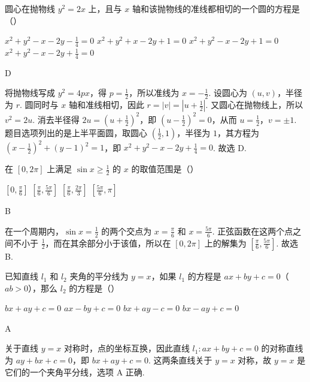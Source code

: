 \begin{problem}
圆心在抛物线 \(y^{2} = 2x \) 上，且与 \(x \) 轴和该抛物线的准线都相切的一个圆的方程是（\quad）

\choices
    {\(x^{2} + y^{2} - x - 2y - \frac{1}{4} = 0\)}
    {\(x^{2} + y^{2} + x - 2y + 1 = 0\)}
    {\(x^{2} + y^{2} - x - 2y + 1 = 0\)}
    {\(x^{2} + y^{2} - x - 2y + \frac{1}{4} = 0\)}

\begin{answer}
D
\end{answer}

\begin{solution}
将抛物线写成 \(y^2=4px\)，得 \(p=\frac{1}{2}\)，所以准线为 \(x=-\frac{1}{2}\). 设圆心为 \((u,v)\)，半径为 \(r\). 圆同时与 \(x\) 轴和准线相切，因此 \(r=|v|=\left|u+\frac{1}{2}\right|\). 又圆心在抛物线上，所以 \(v^2=2u\). 消去半径得
\(2u=\left(u+\frac{1}{2}\right)^2\)，即 \(\left(u-\frac{1}{2}\right)^2=0\)，从而 \(u=\frac{1}{2}\)，\(v=\pm1\). 题目选项列出的是上半平面圆，取圆心 \(\left(\frac{1}{2},1\right)\)，半径为 \(1\)，其方程为 \(\left(x-\frac{1}{2}\right)^2+(y-1)^2=1\)，即 \(x^2+y^2-x-2y+\frac{1}{4}=0\). 故选 D.
\end{solution}
\end{problem}

\begin{problem}
在 \([0,2\pi]\) 上满足 \(\sin x \geqslant \frac{1}{2}\) 的 \(x\) 的取值范围是（\quad）

\choices
    {\(\left[0, \frac{\pi}{6}\right]\)}
    {\(\left[\frac{\pi}{6}, \frac{5\pi}{6}\right]\)}
    {\(\left[\frac{\pi}{6}, \frac{2\pi}{3}\right]\)}
    {\(\left[\frac{5\pi}{6}, \pi\right]\)}

\begin{answer}
B
\end{answer}

\begin{solution}
在一个周期内，\(\sin x=\frac{1}{2}\) 的两个交点为 \(x=\frac{\pi}{6}\) 和 \(x=\frac{5\pi}{6}\). 正弦函数在这两个点之间不小于 \(\frac{1}{2}\)，而在其余部分小于该值，所以在 \([0,2\pi]\) 上的解集为 \(\left[\frac{\pi}{6},\frac{5\pi}{6}\right]\). 故选 B.
\end{solution}
\end{problem}

\begin{problem}
已知直线 \(l_{1}\) 和 \(l_{2}\) 夹角的平分线为 \(y = x\)，如果 \(l_{1}\) 的方程是 \(ax + by + c = 0\)（\(ab > 0\)），那么 \(l_{2}\) 的方程是（\quad）

\choices
    {\(bx + ay + c = 0\)}
    {\(ax - by + c = 0\)}
    {\(bx + ay - c = 0\)}
    {\(bx - ay + c = 0\)}

\begin{answer}
A
\end{answer}

\begin{solution}
关于直线 \(y=x\) 对称时，点的坐标互换，因此直线 \(l_1\colon ax+by+c=0\) 的对称直线为 \(ay+bx+c=0\)，即 \(bx+ay+c=0\). 这两条直线关于 \(y=x\) 对称，故 \(y=x\) 是它们的一个夹角平分线，选项 A 正确.
\end{solution}
\end{problem}

